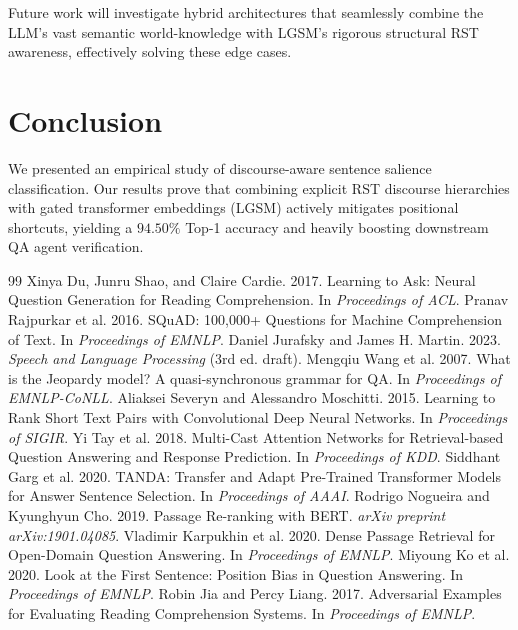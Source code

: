 \documentclass[11pt,a4paper,twocolumn]{article}
\begin{document}
Future work will investigate hybrid architectures that seamlessly combine the LLM's vast semantic world-knowledge with LGSM's rigorous structural RST awareness, effectively solving these edge cases.

\section{Conclusion}
We presented an empirical study of discourse-aware sentence salience classification. Our results prove that combining explicit RST discourse hierarchies with gated transformer embeddings (LGSM) actively mitigates positional shortcuts, yielding a $94.50\%$ Top-1 accuracy and heavily boosting downstream QA agent verification.


\begin{thebibliography}{99}
 Xinya Du, Junru Shao, and Claire Cardie. 2017. Learning to Ask: Neural Question Generation for Reading Comprehension. In \textit{Proceedings of ACL}.
 Pranav Rajpurkar et al. 2016. SQuAD: 100,000+ Questions for Machine Comprehension of Text. In \textit{Proceedings of EMNLP}.
 Daniel Jurafsky and James H. Martin. 2023. \textit{Speech and Language Processing} (3rd ed. draft).
 Mengqiu Wang et al. 2007. What is the Jeopardy model? A quasi-synchronous grammar for QA. In \textit{Proceedings of EMNLP-CoNLL}.
 Aliaksei Severyn and Alessandro Moschitti. 2015. Learning to Rank Short Text Pairs with Convolutional Deep Neural Networks. In \textit{Proceedings of SIGIR}.
 Yi Tay et al. 2018. Multi-Cast Attention Networks for Retrieval-based Question Answering and Response Prediction. In \textit{Proceedings of KDD}.
 Siddhant Garg et al. 2020. TANDA: Transfer and Adapt Pre-Trained Transformer Models for Answer Sentence Selection. In \textit{Proceedings of AAAI}.
 Rodrigo Nogueira and Kyunghyun Cho. 2019. Passage Re-ranking with BERT. \textit{arXiv preprint arXiv:1901.04085}.
 Vladimir Karpukhin et al. 2020. Dense Passage Retrieval for Open-Domain Question Answering. In \textit{Proceedings of EMNLP}.
 Miyoung Ko et al. 2020. Look at the First Sentence: Position Bias in Question Answering. In \textit{Proceedings of EMNLP}.
 Robin Jia and Percy Liang. 2017. Adversarial Examples for Evaluating Reading Comprehension Systems. In \textit{Proceedings of EMNLP}.

\end{thebibliography}
\end{document}
